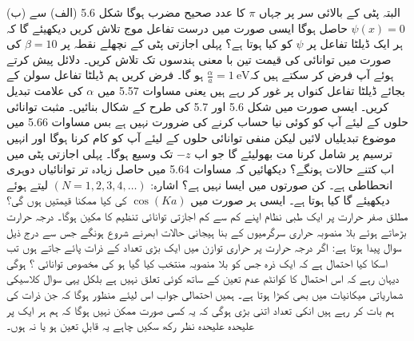 (ب)  البتہ پٹی کے بالائی سر پر جہاں  $\pi$ کا عدد صحیح مضرب ہوگا شکل \num{5.6} (الف) سے \(\psi(x) = 0\) حاصل ہوگا ایسی صورت میں درست تفاعل موج تلاش کریں دیکھیئے گا کہ ہر ایک ڈیلٹا تفاعل پر \(\psi\) کو کیا ہوتا ہے؟
پہلی اجازتی پٹی کے نچھلے نقطہ پر \(\beta = 10\) کی صورت میں توانائی کی قیمت تین با معنی ہندسوں تک تلاش کریں۔ دلائل پیش کرتے ہوئے آپ فرض کر سکتے ہیں کہ\(\frac{\alpha}{a} = \SI{1}{\electronvolt}\) ہو گا۔
فرض کریں ہم ڈیلٹا تفاعل سولن کے بجائے ڈیلٹا تفاعل کنواں پر غور کر رہے ہیں یعنی مساوات \num{5.57} میں \(\alpha\) کی علامت تبدیل کریں۔ ایسی صورت میں شکل \num{5.6} اور \num{5.7} کی طرح کے شکال بنائیں۔ مثبت توانائی حلوں کے لیئے آپ کو کوئی نیا حساب کرنے کی ضرورت نہیں ہے بس مساوات \num{5.66} میں موضوع تبدیلیاں لائیں لیکن منفی توانائی حلوں کے لیئے آپ کو کام کرنا ہوگا اور انہیں ترسیم پر شامل کرنا مت بھولیئے گا جو اب \(-z\) تک وسیع ہوگا۔ پہلی اجازتی پٹی میں اب کتنے حالات ہونگے؟
دیکھائیں کہ مساوات \num{5.64} میں حاصل زیادہ تر توانائیاں دوہری انحطاطی ہے۔ کن صورتوں میں ایسا نہیں ہے؟ اشارہ: \((N=1, 2, 3, 4, \dots)\) لیتے ہوئے دیکھیئے گا کیا ہوتا ہے۔ ایسی ہر صورت میں \(\cos(Ka)\) کی کیا ممکنا قیمتیں ہوں گی؟
مطلق صفر حرارت پر ایک طبی نظام اپنے کم سے کم اجازتی توانائی تنظیم کا مکین ہوگا۔ درجہ حرارت بڑھاتے ہوئے بلا منصوبہ حراری سرگرمیوں کے بنا ہیجانی حالات ابھرنے شروع ہونگے جس سے درج ذیل سوال پیدا ہوتا ہے: اگر  درجہ حرارت پر حراری توازن میں ایک بڑی تعداد  کے ذرات پائے جاتے ہوں تب اسکا کیا احتمال ہے کہ ایک ذرہ جس کو بلا منصوبہ منتخب کیا گیا ہو کی مخصوص توانائی ؟ ہوگی دیہان رہے کہ اس احتمال کا کوانٹم عدم تعین کے ساتھ کوئی تعلق نہیں ہے بلکل یہی سوال کلاسیکی شماریاتی میکانیات میں بھی کھڑا ہوتا ہے۔ ہمیں احتمالی جواب اس لیئے منظور ہوگا کہ جن ذرات کی ہم بات کر رہے ہیں انکی تعداد اتنی بڑی ہوگی کہ یہ کسی صورت ممکن نہیں ہوگا کہ ہم ہر ایک پر علیحدہ علیحدہ نظر رکھ سکیں چاہے یہ قابلِ تعین ہو یا نہ ہوں۔

